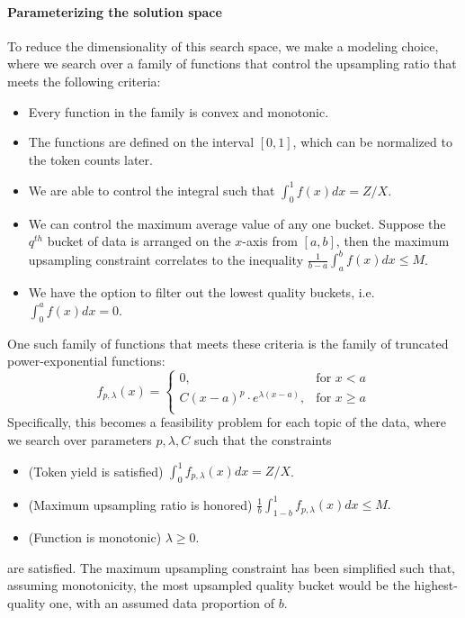 \documentclass[table]{ai2style/ai2}
\begin{document}
{{\paragraph{Parameterizing the solution space} To reduce the dimensionality of this search space, we make a modeling choice, where we search over a family of functions that control the upsampling ratio that meets the following criteria:
\begin{itemize}
    \item Every function in the family is convex and monotonic.
    \item The functions are defined on the interval $[0,1]$, which can be normalized to the token counts later.
    \item We are able to control the integral such that $\int_0^1f(x)dx = Z/X$.
    \item We can control the maximum average value of any one bucket. Suppose the $q^{th}$ bucket of data is arranged on the $x$-axis from $[a,b]$, then the maximum upsampling constraint correlates to the inequality $\frac{1}{b-a} \int_a^b f(x)dx \leq M$.
    \item We have the option to filter out the lowest quality buckets, i.e. $\int_0^a f(x)dx = 0.$
\end{itemize}

One such family of functions that meets these criteria is the family of truncated power-exponential functions:
\[
f_{p, \lambda}(x) =
  \begin{cases}
    0, & \text{for } x < a \\
    C(x-a)^p\cdot e^{\lambda(x-a)}, & \text{for } x \geq a\\
  \end{cases}
  \]
Specifically, this becomes a feasibility problem for each topic of the data, where we search over parameters $p, \lambda, C$ such that the constraints \begin{itemize}
    \item (Token yield is satisfied) $\int_0^1 f_{p,\lambda}(x)dx = Z/X$.
    \item (Maximum upsampling ratio is honored) $\frac{1}{b}\int_{1-b}^1 f_{p, \lambda}(x) dx \leq M.$
    \item (Function is monotonic) $\lambda \geq 0.$
\end{itemize}
are satisfied. The maximum upsampling constraint has been simplified such that, assuming monotonicity, the most upsampled quality bucket would be the highest-quality one, with an assumed data proportion of $b$.

}}
\end{document}
